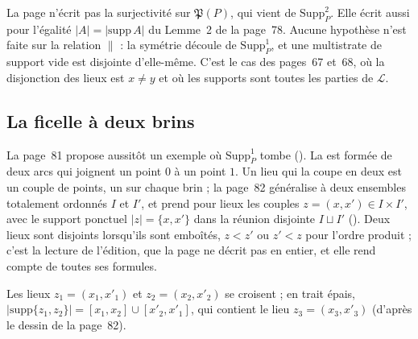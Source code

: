 \begin{remarque}
La page n'écrit pas la surjectivité sur $\mathfrak P(P)$, qui vient de $\mathrm{Supp}^2_P$. Elle écrit aussi  pour l'égalité $|A| = |\mathrm{supp}\, A|$ du Lemme~2 de la page~78. Aucune hypothèse n'est faite sur la relation $\parallel$ : la symétrie découle de $\mathrm{Supp}^1_P$, et une multistrate de support vide est disjointe d'elle-même. C'est le cas  des pages~67 et~68, où la disjonction des lieux est $x \neq y$ et où les supports sont toutes les parties de $\mathcal L$.
\end{remarque}

\subsection*{La ficelle à deux brins}

La page~81 propose aussitôt un exemple où $\mathrm{Supp}^1_P$ tombe (). La  est formée de deux arcs qui joignent un point $0$ à un point $1$. Un lieu qui la coupe en deux est un couple de points, un sur chaque brin ; la page~82 généralise à deux ensembles totalement ordonnés $I$ et $I'$, et prend pour lieux les couples $z = (x, x') \in I \times I'$, avec le support ponctuel $|z| = \{x, x'\}$ dans la réunion disjointe $I \sqcup I'$ (). Deux lieux sont disjoints lorsqu'ils sont emboîtés, $z < z'$ ou $z' < z$ pour l'ordre produit ; c'est la lecture de l'édition, que la page ne décrit pas en entier, et elle rend compte de toutes ses formules.

\begin{center}
\end{center}
{\small Les lieux $z_1 = (x_1, x'_1)$ et $z_2 = (x_2, x'_2)$ se croisent ; en trait épais, $|\mathrm{supp}\{z_1, z_2\}| = [x_1, x_2] \cup [x'_2, x'_1]$, qui contient le lieu $z_3 = (x_3, x'_3)$ (d'après le dessin de la page~82).\par}
\medskip

